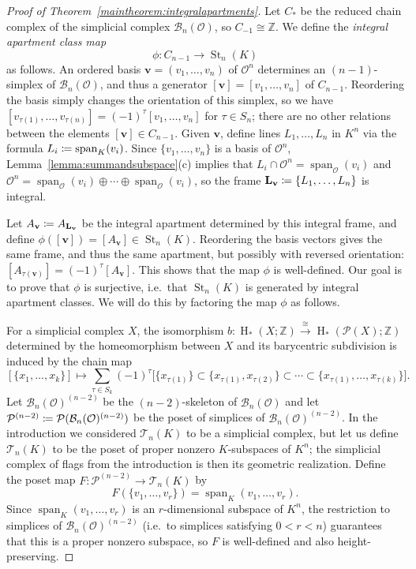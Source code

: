 \documentclass[11 pt]{article}
\theoremstyle{plain}
\theoremstyle{definition}
\numberwithin{equation}{section}
\newcommand\Z{\ensuremath{\mathbb{Z}}}
\DeclareMathOperator{\HH}{H}
\renewcommand{\O}{\mathcal{O}}
\newcommand\PartialBases{\ensuremath{\mathcal{B}}}
\newcommand{\PB}{\PartialBases}
\newcommand\Tits{\ensuremath{\mathcal{T}}}
\DeclareMathOperator{\St}{St}
\newcommand\LL{\mathbf{L}}
\newcommand\vv{\mathbf{v}}
\newcommand\Poset{\ensuremath{\mathcal{P}}}
\newcommand\PP{\Poset^{(n-2)}}
\newcommand\coloneq{\mathrel{\mathop:}\mkern-1.2mu=}
\DeclareMathOperator\spn{span}
\newcommand\iso{\cong}
\begin{document}
\begin{proof}[{Proof of Theorem~\ref{maintheorem:integralapartments}}]
Let $C_\ast$ be the reduced chain complex of the simplicial complex $\PB_n(\O)$, so $C_{-1}\iso \Z$. 
We define the \emph{integral apartment class map} 
\[\phi\colon C_{n-1}\to \St_n(K)\] 
as follows. An ordered  basis $\vv=(v_1,\ldots,v_n)$ of $\O^n$ determines an $(n-1)$-simplex of $\PB_n(\O)$, and thus a generator $[\vv]=[v_1,\ldots,v_n]$ of $C_{n-1}$.  Reordering the basis simply changes the orientation of this simplex, so we have $[v_{\tau(1)},\ldots,v_{\tau(n)}]=(-1)^\tau[v_1,\ldots,v_n]$ for $\tau\in S_n$; there are no other relations between the elements $[\vv]\in C_{n-1}$.
Given $\vv$, define lines $L_1,\ldots,L_n$ in $K^n$ via the formula $L_i \coloneq \spn_K(v_i)$.  Since $\{v_1,\ldots,v_n\}$ is a basis of $\O^n$, Lemma~\ref{lemma:summandsubspace}(c) implies  that $L_i\cap \O^n=\spn_\O(v_i)$ and 
 $\O^n=\spn_\O(v_i)\oplus\cdots\oplus \spn_\O(v_i)$, so the frame $\LL_{\vv}\coloneq \{L_1,\ldots,L_n\}$ is integral.   

Let $A_{\vv}\coloneq A_{\LL_{\vv}}$ be the integral apartment determined by this integral frame, and define $\phi([\vv])=[A_{\vv}]\in \St_n(K)$. Reordering the basis vectors gives the same frame, and thus the same apartment, but possibly with reversed orientation: $[A_{\tau(\vv)}]=(-1)^\tau [A_{\vv}]$. This shows that the map $\phi$ is well-defined. Our goal is to prove that $\phi$ is surjective, i.e.\ that $\St_n(K)$ is generated by integral apartment classes. We will do this by factoring the map $\phi$ as follows.

For a simplicial complex $X$, the isomorphism $b\colon \HH_{\ast}(X;\Z) \stackrel{\iso}{\rightarrow} \HH_{\ast}(\Poset(X);\Z)$ determined by the homeomorphism between $X$ and its barycentric subdivision is induced by the chain map \[[\{x_1,\ldots,x_k\}]\mapsto\sum_{\tau\in S_k}(-1)^\tau \big[\{x_{\tau(1)}\}\subset \{x_{\tau(1)},x_{\tau(2)}\}\subset \cdots\subset \{x_{\tau(1)},\ldots,x_{\tau(k)}\}\big].\]
Let $\PB_n(\O)^{(n-2)}$ be the $(n-2)$-skeleton of $\PB_n(\O)$ and let $\PP\coloneq \Poset(\PB_n(\O)^{(n-2)})$ be the poset of simplices of $\PB_n(\O)^{(n-2)}$. 
In the introduction we considered $\Tits_n(K)$ to be a simplicial complex, but let us define $\Tits_n(K)$ to be the poset of proper nonzero $K$-subspaces of $K^n$; the simplicial complex of flags from the introduction is then its geometric realization. Define the poset map $F\colon \PP\to \Tits_n(K)$ by \[F(\{v_1,\ldots,v_r\})=\spn_K(v_1,\ldots,v_r).\]
Since $\spn_K(v_1,\ldots,v_r)$ is an $r$-dimensional subspace of $K^n$, the restriction to simplices of $\PB_n(\O)^{(n-2)}$ (i.e.\ to simplices satisfying $0<r<n$) guarantees that this is a proper nonzero subspace, so $F$ is well-defined and also height-preserving.


\end{proof}
\end{document}
